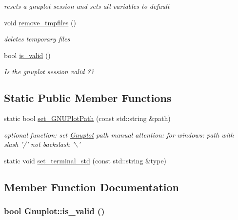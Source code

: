 \begin{DoxyCompactItemize}
\begin{DoxyCompactList}\small\item\em resets a gnuplot session and sets all variables to default \item\end{DoxyCompactList}\item 
\hypertarget{class_gnuplot_a2e449552587b0055f40f4ee079d62a8d}{
void \hyperlink{class_gnuplot_a2e449552587b0055f40f4ee079d62a8d}{remove\_\-tmpfiles} ()}
\label{class_gnuplot_a2e449552587b0055f40f4ee079d62a8d}

\begin{DoxyCompactList}\small\item\em deletes temporary files \item\end{DoxyCompactList}\item 
bool \hyperlink{class_gnuplot_a3135ffebb308b50c4f3178a62b23ab03}{is\_\-valid} ()
\begin{DoxyCompactList}\small\item\em Is the gnuplot session valid ?? \item\end{DoxyCompactList}\end{DoxyCompactItemize}
\subsection*{Static Public Member Functions}
\begin{DoxyCompactItemize}
\item 
static bool \hyperlink{class_gnuplot_a67cae885c26ced821e335d98986f1967}{set\_\-GNUPlotPath} (const std::string \&path)
\begin{DoxyCompactList}\small\item\em optional function: set \hyperlink{class_gnuplot}{Gnuplot} path manual attention: for windows: path with slash '/' not backslash '$\backslash$' \item\end{DoxyCompactList}\item 
static void \hyperlink{class_gnuplot_a21feba7a3916708b742c3dc25850ab2f}{set\_\-terminal\_\-std} (const std::string \&type)
\end{DoxyCompactItemize}


\subsection{Member Function Documentation}
\hypertarget{class_gnuplot_a3135ffebb308b50c4f3178a62b23ab03}{
\subsubsection[{is\_\-valid}]{\setlength{\rightskip}{0pt plus 5cm}bool Gnuplot::is\_\-valid ()}}
\label{class_gnuplot_a3135ffebb308b50c4f3178a62b23ab03}


